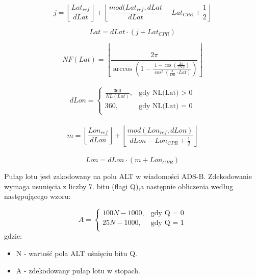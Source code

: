 \documentclass[eng,printmode]{mgr}
\newcommand{\floor}[1]{\left\lfloor #1 \right\rfloor}
\begin{document}
\begin{equation}
j = \floor{\frac{Lat_{ref}}{dLat}} + \floor{\frac{mod(Lat_{ref},dLat}{dLat} - Lat_{CPR} + \frac{1}{2}}
\end{equation}

\begin{equation}
Lat = dLat \cdot \left(j + Lat_{CPR}\right)
\end{equation}

\begin{equation}
NF(Lat) = \floor{\frac{2\pi}{\arccos\left(1 - \frac{1 - \cos\left(\frac{2\pi}{2NZ}\right)}{\cos^2\left(\frac{\pi}{180} \cdot Lat\right)}\right)}}
\end{equation}
\\
\begin{equation}
\renewcommand*{\arraystretch}{1.3}
dLon= \left\{ \begin{array}{ll}

\frac{360}{NL(Lat)}, & \textrm{gdy NL(Lat) > 0}\\
360 , & \textrm{gdy NL(Lat) = 0}\\

\end{array} \right.
\end{equation}
\\
\begin{equation}
m = \floor{\frac{Lon_{ref}}{dLon}} + \floor{\frac{mod(Lon_{ref},dLon)}{dLon - Lon_{CPR} + \frac{1}{2}}}
\end{equation}
\\
\begin{equation}
Lon = dLon \cdot \left(m + Lon_{CPR}\right)
\end{equation}

Pułap lotu jest zakodowany na polu ALT w wiadomości ADS-B. Zdekodowanie wymaga usunięcia z liczby 7. bitu (flagi Q),a następnie obliczenia według następującego wzoru:

\begin{equation}
\renewcommand*{\arraystretch}{1.3}
A= \left\{ \begin{array}{ll}

100N - 1000, & \textrm{gdy Q = 0}\\
25N - 1000, & \textrm{gdy Q = 1}\\

\end{array} \right.
\end{equation}
\newpage
\noindent
gdzie: 
\begin{itemize}
\item N - wartość pola ALT uśnięciu bitu Q.
\item A - zdekodowany pułap lotu w stopach.
\end{itemize}
\end{document}
